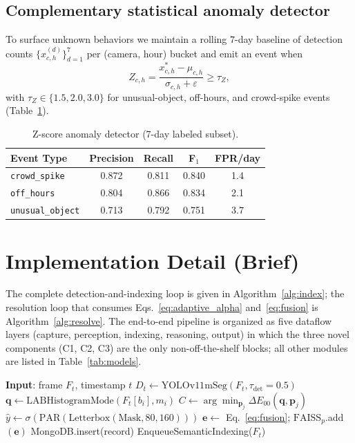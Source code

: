 ﻿\documentclass[conference]{IEEEtran}
\theoremstyle{definition}
\begin{document}
\subsection{Complementary statistical anomaly detector}
To surface unknown behaviors we maintain a rolling 7-day baseline of detection counts $\{x_{c,h}^{(d)}\}_{d=1}^7$ per (camera, hour) bucket and emit an event when
\begin{equation}
Z_{c,h} = \frac{x_{c,h}^* - \mu_{c,h}}{\sigma_{c,h}+\varepsilon} \ge \tau_Z,
\label{eq:zscore}
\end{equation}
with $\tau_Z\in\{1.5, 2.0, 3.0\}$ for unusual-object, off-hours, and crowd-spike events (Table~\ref{tab:anomaly_results}).

\begin{table}[!t]
\caption{Z-score anomaly detector (7-day labeled subset).}
\label{tab:anomaly_results}
\centering
\footnotesize
\begin{tabular}{@{}lcccc@{}}
\toprule
Event Type & Precision & Recall & F$_1$ & FPR/day \\
\midrule
\texttt{crowd\_spike}    & 0.872 & 0.811 & 0.840 & 1.4 \\
\texttt{off\_hours}      & 0.804 & 0.866 & 0.834 & 2.1 \\
\texttt{unusual\_object} & 0.713 & 0.792 & 0.751 & 3.7 \\
\bottomrule
\end{tabular}
\end{table}

\section{Implementation Detail (Brief)}

The complete detection-and-indexing loop is given in Algorithm~\ref{alg:index}; the resolution loop that consumes Eqs.~\eqref{eq:adaptive_alpha} and~\eqref{eq:fusion} is Algorithm~\ref{alg:resolve}. The end-to-end pipeline is organized as five dataflow layers (capture, perception, indexing, reasoning, output) in which the three novel components (C1, C2, C3) are the only non-off-the-shelf blocks; all other modules are listed in Table~\ref{tab:models}.

\begin{algorithm}[H]
\caption{Detection and indexing per frame.}
\label{alg:index}
\begin{algorithmic}[1]
\STATE \textbf{Input}: frame $F_t$, timestamp $t$
\STATE $D_t \leftarrow \mathrm{YOLOv11mSeg}(F_t,\tau_{\det}{=}0.5)$
    \STATE $\mathbf{q}\leftarrow \mathrm{LABHistogramMode}(F_t[b_i],m_i)$
    \STATE $C\leftarrow \arg\min_{\mathbf{p}_j}\Delta E_{00}(\mathbf{q},\mathbf{p}_j)$
        \STATE $\hat{y}\leftarrow \sigma(\mathrm{PAR}(\mathrm{Letterbox}(\mathrm{Mask},80,160)))$
        \STATE $\mathbf{e}\leftarrow$ Eq.~\eqref{eq:fusion}; $\mathrm{FAISS}_p$.add$(\mathbf{e})$
    \ENDIF
    \STATE MongoDB.insert(record)
\ENDFOR
{} \STATE EnqueueSemanticIndexing($F_t$) \ENDIF
\end{algorithmic}
\end{algorithm}
\end{document}
